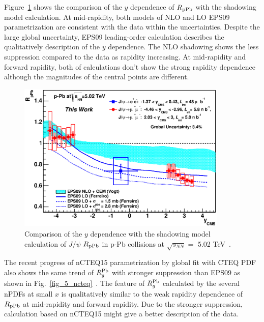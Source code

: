 Figure~\ref{fig_5_rppbyvsshadow} shows the comparison of the $y$ dependence of $R_{\rm{pPb}}$ with the shadowing model calculation. 
At mid-rapidity, both models of NLO and LO EPS09 parametrization are consistent with the data within the uncertainties. 
Despite the large global uncertainty, EPS09 leading-order calculation describes the qualitatively description of the $y$ dependence. 
The NLO shadowing shows the less suppression compared to the data as rapidity increasing. 
At mid-rapidity and forward rapidity, both of calculations don\rq{}t show the strong rapidity dependence although the magnitudes of the central points are different.  
\begin{figure}[!h]
  \centering
  \includegraphics[width=10cm]{chap5/figure/ModelComp/JpsiRpPb_shadowing_y.eps}
  \caption{Comparison of the $y$ dependence with the shadowing model calculation of $J/\psi$ $R_{\rm{pPb}}$ in p-Pb collisions at $\sqrt{s_{NN}}=$ 5.02 TeV~\cite{bib_shadow,bib_shadowlo}.}
  \label{fig_5_rppbyvsshadow}
\end{figure}
The recent progress of nCTEQ15 parametrization by global fit with CTEQ PDF also shows the same trend of $R^{\rm{Pb}}_{g}$ with stronger suppression than EPS09 as shown in Fig.~\ref{fig_5_ncteq}~\cite{bib_ncteq15,bib_cteq,bib_ncteq15shadow}. 
The feature of $R^{\rm{Pb}}_{g}$ calculated by the several nPDFs at small $x$ is qualitatively similar to the weak rapidity dependence of $R_{\rm{pPb}}$ at mid-rapidity and forward rapidity.  
Due to the stronger suppression, calculation based on nCTEQ15 might give a better description of the data. 
